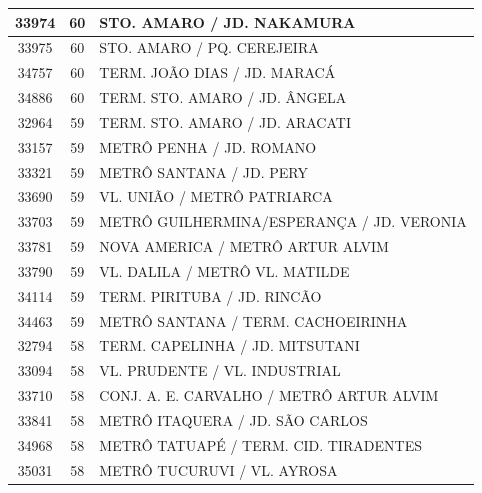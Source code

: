 \documentclass[
	12pt,				%
	oneside,			%
	a4paper,			%
	english,			%
	brazil				%
	]{abntex2ppgsi}
\begin{document}
{{\begin{apendicesenv}
\begin{longtable}{c|c|p{7cm}}
    33974 & 60    & STO. AMARO / JD. NAKAMURA \\
\hline

    33975 & 60    & STO. AMARO / PQ. CEREJEIRA \\
\hline

    34757 & 60    & TERM. JOÃO DIAS / JD. MARACÁ \\
\hline

    34886 & 60    & TERM. STO. AMARO / JD. ÂNGELA \\
\hline

    32964 & 59    & TERM. STO. AMARO / JD. ARACATI \\
\hline

    33157 & 59    & METRÔ PENHA / JD. ROMANO \\
\hline

    33321 & 59    & METRÔ SANTANA / JD. PERY \\
\hline

    33690 & 59    & VL. UNIÃO / METRÔ PATRIARCA \\
\hline

    33703 & 59    & METRÔ GUILHERMINA/ESPERANÇA / JD. VERONIA \\
\hline

    33781 & 59    & NOVA AMERICA / METRÔ ARTUR ALVIM \\
\hline

    33790 & 59    & VL. DALILA / METRÔ VL. MATILDE \\
\hline

    34114 & 59    & TERM. PIRITUBA / JD. RINCÃO \\
\hline

    34463 & 59    & METRÔ SANTANA / TERM. CACHOEIRINHA \\
\hline

    32794 & 58    & TERM. CAPELINHA / JD. MITSUTANI \\
\hline

    33094 & 58    & VL. PRUDENTE / VL. INDUSTRIAL \\
\hline

    33710 & 58    & CONJ. A. E. CARVALHO / METRÔ ARTUR ALVIM \\
\hline

    33841 & 58    & METRÔ ITAQUERA / JD. SÃO CARLOS \\
\hline

    34968 & 58    & METRÔ TATUAPÉ / TERM. CID. TIRADENTES \\
\hline

    35031 & 58    & METRÔ TUCURUVI / VL. AYROSA \\
\hline


\end{longtable}
\end{apendicesenv}}}
\end{document}
